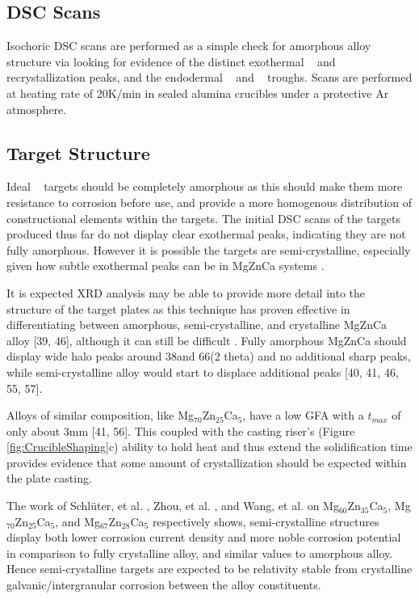 \documentclass[a4paper,12pt,oneside]{report}%
\begin{document}
\subsection{DSC Scans}
Isochoric DSC scans are performed as a simple check for amorphous alloy structure via looking for evidence of the distinct exothermal \Tg~ and \Tx~ recrystallization peaks, and the endodermal \Tm~ and \Tl~ troughs. Scans are performed at heating rate of 20K/min in sealed alumina crucibles under a protective Ar atmosphere.

\subsection{Target Structure}
Ideal \MgZnCa~ targets should be completely amorphous as this should make them more resistance to corrosion before use, and provide a more homogenous distribution of constructional elements within the targets. The initial DSC scans of the targets produced thus far do not display clear exothermal peaks, indicating they are not fully amorphous. However it is possible the targets are semi-crystalline, especially given how subtle exothermal peaks can be in MgZnCa systems \cite{Gu2010}. 

It is expected XRD analysis may be able to provide more detail into the structure of the target plates as this technique has proven effective in differentiating between amorphous, semi-crystalline, and crystalline MgZnCa alloy [39, 46], although it can still be difficult \cite{Zhou2013}. Fully amorphous MgZnCa should display wide halo peaks around 38\degree and 66\degree (2 theta) and no additional sharp peaks, while semi-crystalline alloy would start to displace additional peaks [40, 41, 46, 55, 57]. 

Alloys of similar composition, like Mg$_{70}$Zn$_{25}$Ca$_{5}$, have a low GFA with a $t_{max}$ of only about 3mm [41, 56]. This coupled with the casting riser's (Figure \ref{fig:CrucibleShaping}c) ability to hold heat and thus extend the solidification time provides evidence that some amount of crystallization should be expected within the plate casting. 

The work of Schlüter, et al. \cite{Schluter2012}, Zhou, et al. \cite{Zhou2013}, and Wang, et al. \cite{Wang2012} on Mg$_{60}$Zn$_{35}$Ca$_{5}$, Mg$_{70}$Zn$_{25}$Ca$_{5}$, and Mg$_{67}$Zn$_{28}$Ca$_{5}$ respectively shows, semi-crystalline structures display both lower corrosion current density and more noble corrosion potential in comparison to fully crystalline alloy, and similar values to amorphous alloy. Hence semi-crystalline targets are expected to be relativity stable from crystalline galvanic/intergranular corrosion between the alloy constituents. 
\end{document}
